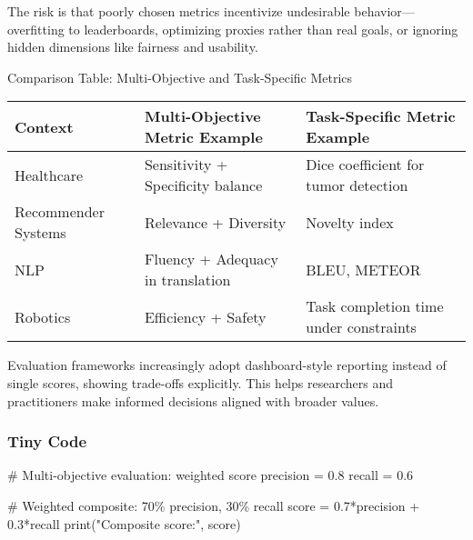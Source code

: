 \documentclass[
  letterpaper,
  DIV=11,
  numbers=noendperiod]{scrreprt}
\newenvironment{Shaded}{\begin{snugshade}}{\end{snugshade}}
\newcommand{\BuiltInTok}[1]{\textcolor[rgb]{0.00,0.23,0.31}{#1}}
\newcommand{\CommentTok}[1]{\textcolor[rgb]{0.37,0.37,0.37}{#1}}
\newcommand{\FloatTok}[1]{\textcolor[rgb]{0.68,0.00,0.00}{#1}}
\newcommand{\NormalTok}[1]{\textcolor[rgb]{0.00,0.23,0.31}{#1}}
\newcommand{\OperatorTok}[1]{\textcolor[rgb]{0.37,0.37,0.37}{#1}}
\newcommand{\StringTok}[1]{\textcolor[rgb]{0.13,0.47,0.30}{#1}}
\begin{document}
The risk is that poorly chosen metrics incentivize undesirable
behavior---overfitting to leaderboards, optimizing proxies rather than
real goals, or ignoring hidden dimensions like fairness and usability.

Comparison Table: Multi-Objective and Task-Specific Metrics

\begin{longtable}[]{@{}
  >{\raggedright\arraybackslash}p{}
  >{\raggedright\arraybackslash}p{}
  >{\raggedright\arraybackslash}p{}@{}}
\toprule\noalign{}
\begin{minipage}[b]{\linewidth}\raggedright
Context
\end{minipage} & \begin{minipage}[b]{\linewidth}\raggedright
Multi-Objective Metric Example
\end{minipage} & \begin{minipage}[b]{\linewidth}\raggedright
Task-Specific Metric Example
\end{minipage} \\
\midrule\noalign{}
\endhead
\bottomrule\noalign{}
\endlastfoot
Healthcare & Sensitivity + Specificity balance & Dice coefficient for
tumor detection \\
Recommender Systems & Relevance + Diversity & Novelty index \\
NLP & Fluency + Adequacy in translation & BLEU, METEOR \\
Robotics & Efficiency + Safety & Task completion time under
constraints \\
\end{longtable}

Evaluation frameworks increasingly adopt dashboard-style reporting
instead of single scores, showing trade-offs explicitly. This helps
researchers and practitioners make informed decisions aligned with
broader values.

\subsubsection{Tiny Code}\label{tiny-code-83}

\begin{Shaded}
\begin{Highlighting}[]
\CommentTok{\# Multi{-}objective evaluation: weighted score}
\NormalTok{precision }\OperatorTok{=} \FloatTok{0.8}
\NormalTok{recall }\OperatorTok{=} \FloatTok{0.6}

\CommentTok{\# Weighted composite: 70\% precision, 30\% recall}
\NormalTok{score }\OperatorTok{=} \FloatTok{0.7}\OperatorTok{*}\NormalTok{precision }\OperatorTok{+} \FloatTok{0.3}\OperatorTok{*}\NormalTok{recall}
\BuiltInTok{print}\NormalTok{(}\StringTok{"Composite score:"}\NormalTok{, score)}
\end{Highlighting}
\end{Shaded}
\end{document}
